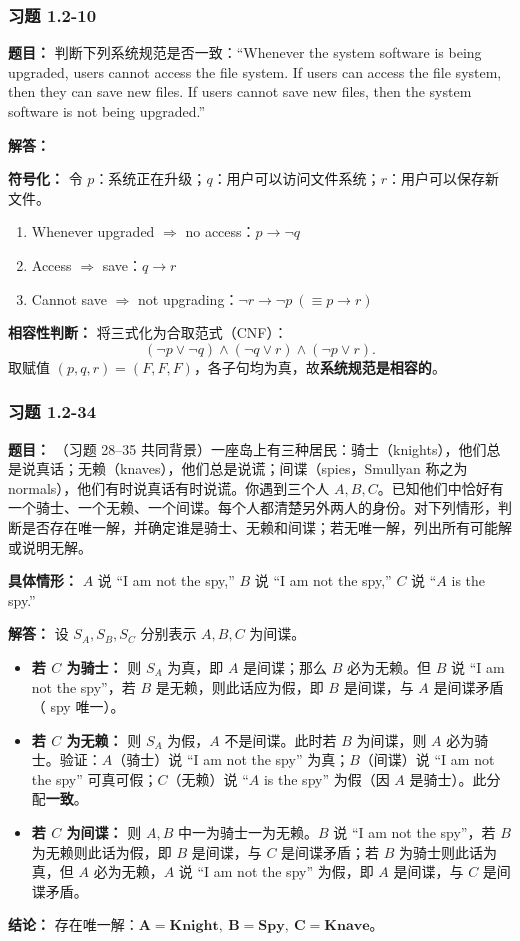 \documentclass[11pt,UTF8]{article}
\begin{document}
\subsubsection*{习题 1.2-10}
\textbf{题目：} 判断下列系统规范是否一致：``Whenever the system software is being upgraded, users cannot access the file system. If users can access the file system, then they can save new files. If users cannot save new files, then the system software is not being upgraded.''

\textbf{解答：}

\textbf{符号化：} 令 $p$：系统正在升级；$q$：用户可以访问文件系统；$r$：用户可以保存新文件。
\begin{enumerate}
    \item Whenever upgraded $\Rightarrow$ no access：$p \to \neg q$
    \item Access $\Rightarrow$ save：$q \to r$
    \item Cannot save $\Rightarrow$ not upgrading：$\neg r \to \neg p\ (\equiv p \to r)$
\end{enumerate}

\textbf{相容性判断：} 将三式化为合取范式（CNF）：
\[ (\neg p \lor \neg q) \land (\neg q \lor r) \land (\neg p \lor r). \]
取赋值 $(p,q,r) = (F,F,F)$，各子句均为真，故\textbf{系统规范是相容的}。

\subsubsection*{习题 1.2-34}
\textbf{题目：} （习题 28--35 共同背景）一座岛上有三种居民：骑士（knights），他们总是说真话；无赖（knaves），他们总是说谎；间谍（spies，Smullyan 称之为 normals），他们有时说真话有时说谎。你遇到三个人 $A, B, C$。已知他们中恰好有一个骑士、一个无赖、一个间谍。每个人都清楚另外两人的身份。对下列情形，判断是否存在唯一解，并确定谁是骑士、无赖和间谍；若无唯一解，列出所有可能解或说明无解。

\textbf{具体情形：} $A$ 说 ``I am not the spy,'' $B$ 说 ``I am not the spy,'' $C$ 说 ``$A$ is the spy.''

\textbf{解答：} 设 $S_A, S_B, S_C$ 分别表示 $A, B, C$ 为间谍。
\begin{itemize}
    \item \textbf{若 $C$ 为骑士：} 则 $S_A$ 为真，即 $A$ 是间谍；那么 $B$ 必为无赖。但 $B$ 说 ``I am not the spy''，若 $B$ 是无赖，则此话应为假，即 $B$ 是间谍，与 $A$ 是间谍矛盾（ spy 唯一）。
    \item \textbf{若 $C$ 为无赖：} 则 $S_A$ 为假，$A$ 不是间谍。此时若 $B$ 为间谍，则 $A$ 必为骑士。验证：$A$（骑士）说 ``I am not the spy'' 为真；$B$（间谍）说 ``I am not the spy'' 可真可假；$C$（无赖）说 ``$A$ is the spy'' 为假（因 $A$ 是骑士）。此分配\textbf{一致}。
    \item \textbf{若 $C$ 为间谍：} 则 $A, B$ 中一为骑士一为无赖。$B$ 说 ``I am not the spy''，若 $B$ 为无赖则此话为假，即 $B$ 是间谍，与 $C$ 是间谍矛盾；若 $B$ 为骑士则此话为真，但 $A$ 必为无赖，$A$ 说 ``I am not the spy'' 为假，即 $A$ 是间谍，与 $C$ 是间谍矛盾。
\end{itemize}
\textbf{结论：} 存在唯一解：$\mathbf{A=Knight,\ B=Spy,\ C=Knave}$。
\end{document}
